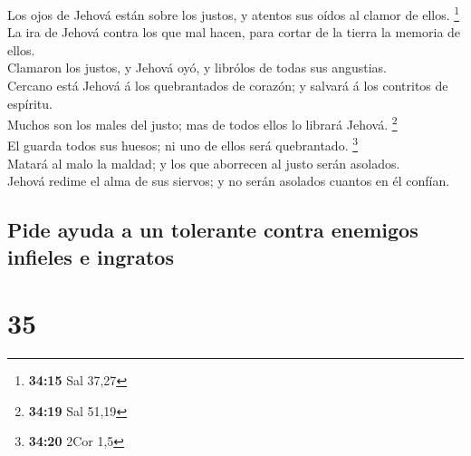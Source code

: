  Los ojos de Jehová están sobre los justos, y atentos sus
oídos al clamor de ellos. \footnote{\textbf{34:15} Sal 37,27}\\
 La ira de Jehová contra los que mal hacen, para cortar de
la tierra la memoria de ellos.\\
 Clamaron los justos, y Jehová oyó, y librólos de todas sus
angustias.\\
 Cercano está Jehová á los quebrantados de corazón; y
salvará á los contritos de espíritu.\\
 Muchos son los males del justo; mas de todos ellos lo
librará Jehová. \footnote{\textbf{34:19} Sal 51,19}\\
 El guarda todos sus huesos; ni uno de ellos será
quebrantado. \footnote{\textbf{34:20} 2Cor 1,5}\\
 Matará al malo la maldad; y los que aborrecen al justo
serán asolados.\\
 Jehová redime el alma de sus siervos; y no serán asolados
cuantos en él confían.

\hypertarget{pide-ayuda-a-un-tolerante-contra-enemigos-infieles-e-ingratos}{%
\subsection{Pide ayuda a un tolerante contra enemigos infieles e
ingratos}\label{pide-ayuda-a-un-tolerante-contra-enemigos-infieles-e-ingratos}}

\hypertarget{section-34}{%
\section{35}\label{section-34}}

